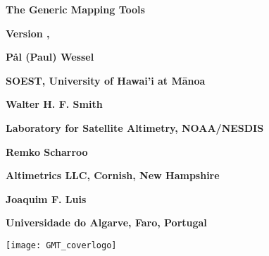 %
%

\thispagestyle{empty}

\begin{center}
\Huge
\textbf{The Generic Mapping Tools}\par 
\vspace{0.5\baselineskip}
\textbf{\GMTTITLE}\par 

\large
\vspace{0.5\baselineskip}
\textbf{Version \GMTDOCVERSION, \GMTDOCDATE}\par 
\vspace{0.25\baselineskip}

\vspace{2.0\baselineskip}

\huge
\textbf{P\aa l (Paul) Wessel}\par 
\vspace{0.5\baselineskip}

\Large
\textbf{SOEST, University of Hawai'i at M\={a}noa}\par 
\vspace{0.5\baselineskip}

\huge
\textbf{Walter H. F. Smith}\par 
\vspace{0.5\baselineskip}

\Large
\textbf{Laboratory for Satellite Altimetry, NOAA/NESDIS}\par 
\vspace{0.5\baselineskip}

\huge
\textbf{Remko Scharroo}\par 
\vspace{0.5\baselineskip}

\Large
\textbf{Altimetrics LLC, Cornish, New Hampshire}\par 
\vspace{0.5\baselineskip}

\huge
\textbf{Joaquim F. Luis}\par 
\vspace{0.5\baselineskip}

\Large
\textbf{Universidade do Algarve, Faro, Portugal}\par 
\vspace{0.5\baselineskip}


\texttt{[image: GMT\_coverlogo]}
\end{center}
